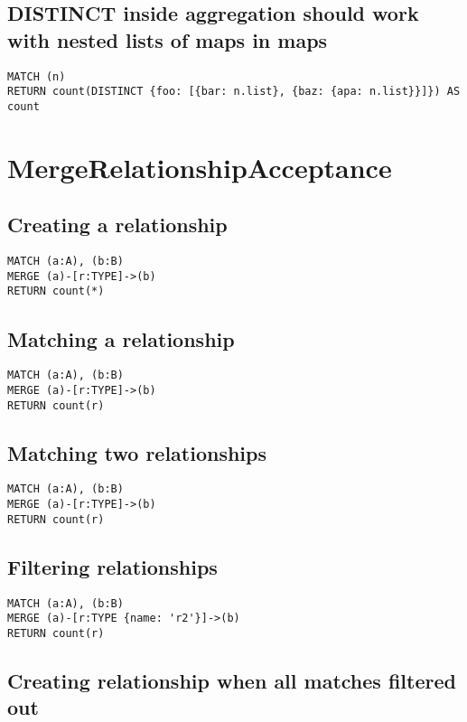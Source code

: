 \subsection{DISTINCT inside aggregation should work with nested lists of maps in maps}

\begin{lstlisting}
MATCH (n)
RETURN count(DISTINCT {foo: [{bar: n.list}, {baz: {apa: n.list}}]}) AS count
\end{lstlisting}
\section{MergeRelationshipAcceptance}


\subsection{Creating a relationship}

\begin{lstlisting}
MATCH (a:A), (b:B)
MERGE (a)-[r:TYPE]->(b)
RETURN count(*)
\end{lstlisting}

\subsection{Matching a relationship}

\begin{lstlisting}
MATCH (a:A), (b:B)
MERGE (a)-[r:TYPE]->(b)
RETURN count(r)
\end{lstlisting}

\subsection{Matching two relationships}

\begin{lstlisting}
MATCH (a:A), (b:B)
MERGE (a)-[r:TYPE]->(b)
RETURN count(r)
\end{lstlisting}

\subsection{Filtering relationships}

\begin{lstlisting}
MATCH (a:A), (b:B)
MERGE (a)-[r:TYPE {name: 'r2'}]->(b)
RETURN count(r)
\end{lstlisting}

\subsection{Creating relationship when all matches filtered out}

